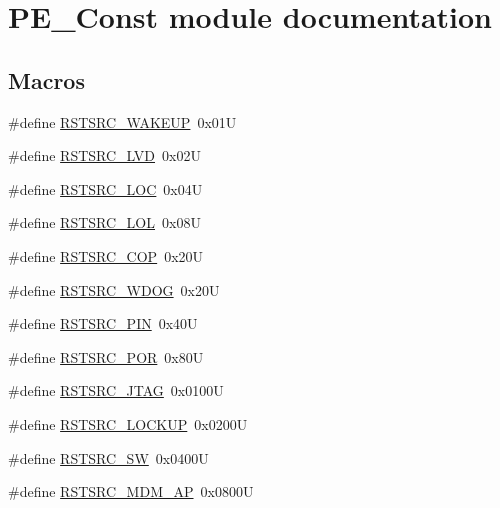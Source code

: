 \hypertarget{group___p_e___const__module}{}\section{P\+E\+\_\+\+Const module documentation}
\label{group___p_e___const__module}
\subsection*{Macros}
\begin{DoxyCompactItemize}
\item 
\#define \hyperlink{group___p_e___const__module_gaeed5dacbb9d0e07213c8840434f6cd6a}{R\+S\+T\+S\+R\+C\+\_\+\+W\+A\+K\+E\+UP}~0x01U
\item 
\#define \hyperlink{group___p_e___const__module_gae1c2803b0eda52457ab29cb138988581}{R\+S\+T\+S\+R\+C\+\_\+\+L\+VD}~0x02U
\item 
\#define \hyperlink{group___p_e___const__module_gabb1e7755f19390476da47c14af3c0a7d}{R\+S\+T\+S\+R\+C\+\_\+\+L\+OC}~0x04U
\item 
\#define \hyperlink{group___p_e___const__module_ga653fd4a8b1b389c8ee4f906182ac1638}{R\+S\+T\+S\+R\+C\+\_\+\+L\+OL}~0x08U
\item 
\#define \hyperlink{group___p_e___const__module_ga140be6eb76fc072ee4176e965b87b244}{R\+S\+T\+S\+R\+C\+\_\+\+C\+OP}~0x20U
\item 
\#define \hyperlink{group___p_e___const__module_ga789b8aee910293e98e3d259ced79864c}{R\+S\+T\+S\+R\+C\+\_\+\+W\+D\+OG}~0x20U
\item 
\#define \hyperlink{group___p_e___const__module_gabdcb9366c44b44d35909bdbf2fcf3d9d}{R\+S\+T\+S\+R\+C\+\_\+\+P\+IN}~0x40U
\item 
\#define \hyperlink{group___p_e___const__module_ga3511c871d0a516c574a91e1bac210238}{R\+S\+T\+S\+R\+C\+\_\+\+P\+OR}~0x80U
\item 
\#define \hyperlink{group___p_e___const__module_ga00a839ede0e69be1bc641f907de8b5f8}{R\+S\+T\+S\+R\+C\+\_\+\+J\+T\+AG}~0x0100U
\item 
\#define \hyperlink{group___p_e___const__module_ga46168abf3bfc8b58479ecace7641559b}{R\+S\+T\+S\+R\+C\+\_\+\+L\+O\+C\+K\+UP}~0x0200U
\item 
\#define \hyperlink{group___p_e___const__module_ga3c4274430f181cdab8c0c705df651784}{R\+S\+T\+S\+R\+C\+\_\+\+SW}~0x0400U
\item 
\#define \hyperlink{group___p_e___const__module_ga18886b7d76fe2b7babb3c16428f6af06}{R\+S\+T\+S\+R\+C\+\_\+\+M\+D\+M\+\_\+\+AP}~0x0800U

\end{DoxyCompactItemize}
